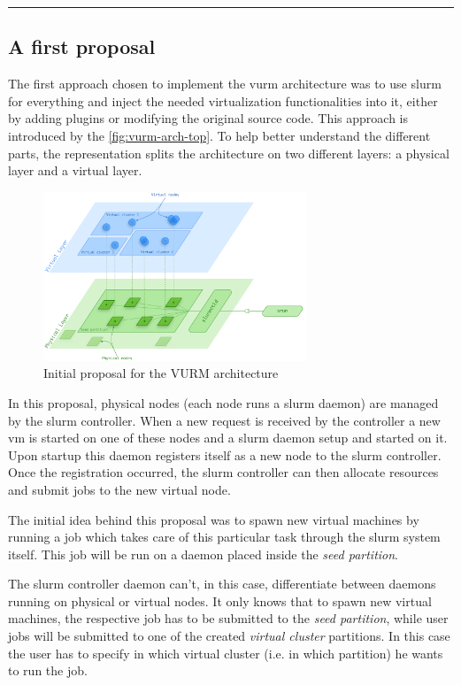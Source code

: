\vspace*{-4.5mm}\rule{\textwidth}{.3pt}

\subsection{A first proposal}

The first approach chosen to implement the \gls{vurm} architecture was to use \gls{slurm} for everything and inject the needed virtualization functionalities into it, either by adding plugins or modifying the original source code. This approach is introduced by the \autoref{fig:vurm-arch-top}. To help better understand the different parts, the representation splits the architecture on two different layers: a physical layer and a virtual layer.

\begin{figure}[ht]
	\centering
	\includegraphics[width=0.7\textwidth]{figures/vurm-arch-bottom-up}
	\caption{Initial proposal for the VURM architecture}
	\label{fig:vurm-arch-top}
\end{figure}

In this proposal, physical nodes (each node runs a \gls{slurm} daemon) are managed by the \gls{slurm} controller. When a new request is received by the controller a new \gls{vm} is started on one of these nodes and a \gls{slurm} daemon setup and started on it. Upon startup this daemon registers itself as a new node to the \gls{slurm} controller. Once the registration occurred, the \gls{slurm} controller can then allocate resources and submit jobs to the new virtual node.

The initial idea behind this proposal was to spawn new virtual machines by running a job which takes care of this particular task through the \gls{slurm} system itself. This job will be run on a daemon placed inside the \emph{seed partition}.

The \gls{slurm} controller daemon can't, in this case, differentiate between daemons running on physical or virtual nodes. It only knows that to spawn new virtual machines, the respective job has to be submitted to the \emph{seed partition}, while user jobs will be submitted to one of the created \emph{virtual cluster} partitions. In this case  the user has to specify in which virtual cluster (i.e. in which partition) he wants to run the job.


